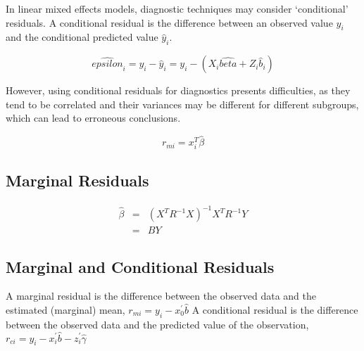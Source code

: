 \documentclass[main.tex]{subfiles}
\begin{document}
	
	In linear mixed effects models, diagnostic techniques may consider `conditional' residuals. A conditional residual is the difference between an observed value $y_{i}$ and the conditional predicted value $\hat{y}_{i} $.
	
	
	\[ \hat{epsilon}_{i} = y_{i} - \hat{y}_{i} = y_{i} - ( X_{i}\hat{beta} + Z_{i}\hat{b}_{i}) \]
	
	
	However, using conditional residuals for diagnostics presents difficulties, as they tend to be correlated and their variances may be different for different subgroups, which can lead to erroneous conclusions.
	
	
	
	
	
	
	
	
	
	
	
	
	
	
	\begin{equation}
	r_{mi}=x^{T}_{i}\hat{\beta}
	\end{equation}
	
	
	\subsection{Marginal Residuals}
	\begin{eqnarray}
	\hat{\beta} &=& (X^{T}R^{-1}X)^{-1}X^{T}R^{-1}Y \nonumber \\
	&=& BY \nonumber
	\end{eqnarray}
	
	
	
	
	
	
	
	
	
	
	
	\subsection{Marginal and Conditional Residuals}
	
	A marginal residual is the difference between the observed data and the estimated (marginal) mean, $r_{mi} = y_i - x_0^{\prime} \hat{b}$
	A conditional residual is the difference between the observed data and the predicted value of the observation,
	$r_{ci} = y_i - x_i^{\prime} \hat{b} - z_i^{\prime} \hat{\gamma}$
	
\end{document}

